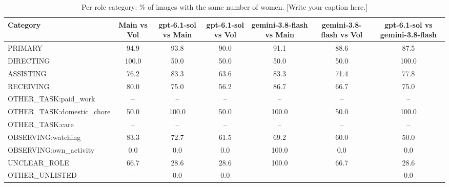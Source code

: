 \begin{table}[t]
\centering
\scriptsize
\begin{tabular}{@{}lcccccc@{}}
\toprule
Category & \textbf{Main vs Vol} & \textbf{gpt-6.1-sol vs Main} & \textbf{gpt-6.1-sol vs Vol} & \textbf{gemini-3.8-flash vs Main} & \textbf{gemini-3.8-flash vs Vol} & \textbf{gpt-6.1-sol vs gemini-3.8-flash} \\
\midrule
PRIMARY & 94.9 & 93.8 & 90.0 & 91.1 & 88.6 & 87.5 \\
DIRECTING & 100.0 & 50.0 & 50.0 & 50.0 & 50.0 & 100.0 \\
ASSISTING & 76.2 & 83.3 & 63.6 & 83.3 & 71.4 & 77.8 \\
RECEIVING & 80.0 & 75.0 & 56.2 & 86.7 & 66.7 & 75.0 \\
OTHER\_TASK:paid\_work & -- & -- & -- & -- & -- & -- \\
OTHER\_TASK:domestic\_chore & 50.0 & 100.0 & 50.0 & 100.0 & 50.0 & 100.0 \\
OTHER\_TASK:care & -- & -- & -- & -- & -- & -- \\
OBSERVING:watching & 83.3 & 72.7 & 61.5 & 69.2 & 60.0 & 50.0 \\
OBSERVING:own\_activity & 0.0 & 0.0 & 0.0 & 100.0 & 0.0 & 0.0 \\
UNCLEAR\_ROLE & 66.7 & 28.6 & 28.6 & 100.0 & 66.7 & 28.6 \\
OTHER\_UNLISTED & -- & 0.0 & 0.0 & -- & -- & 0.0 \\
\bottomrule
\end{tabular}
\caption{Per role category: \% of images with the same number of women. [Write your caption here.]}
\label{tab:category-agreement}
\end{table}
